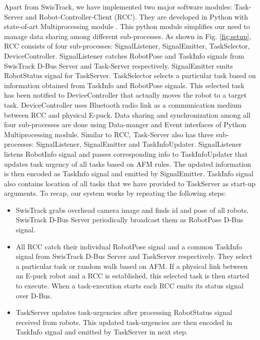 \documentclass{llncs}
\begin{document}
Apart from SwisTrack, we have implemented two major software modules: Task-Server and Robot-Controller-Client (RCC). They are developed in Python with state-of-art Multiprocessing module \cite{Multiprocessing}. This python module simplifies our need to manage data sharing among different sub-processes. As shown in Fig. \ref{fig:setup}, RCC consists of four sub-processes: SignalListener, SignalEmitter, TaskSelector, DeviceController. SignalListener catches RobotPose and TaskInfo signals from SwisTrack D-Bus Server and Task-Server respectively. SignalEmitter emits RobotStatus signal for TaskServer. TaskSelector selects a particular task based on information obtained from TaskInfo and RobotPose signals. This selected task has been notified to DeviceController that actually moves the robot to a target task. DeviceController uses Bluetooth radio link as a communication medium between RCC and physical E-puck. Data sharing and synchronization among all four sub-processes are done using Data-manger and Event interfaces of Python Multiprocessing module. Similar to RCC, Task-Server also has three sub-processes: SignalListener, SignalEmitter and TaskInfoUpdater. SignalListener listens RobotInfo signal and passes corresponding info to TaskInfoUpdater that updates task urgency of all tasks based on AFM rules. The updated information is then encoded as TaskInfo signal and emitted by SignalEmitter. TaskInfo signal also contains location of all tasks that we have provided to TaskServer as start-up arguments. 
To recap, our system works by repeating the following steps:
\begin{itemize}
\item SwisTrack grabs overhead camera image and finds id and pose of all robots. SwisTrack D-Bus Server periodically broadcast them as RobotPose D-Bus signal.
\item All RCC catch their individual RobotPose signal and a common TaskInfo signal from SwisTrack D-Bus Server and TaskServer respectively. They select a particular task or random walk based on AFM. If a physical link between an E-puck robot and a RCC is established, this selected task is then started to execute. When a task-execution starts each RCC emits its status signal over D-Bus.
\item TaskServer updates task-urgencies after processing RobotStatus signal received from robots. This updated task-urgencies are then encoded in TaskInfo signal and emitted by TaskServer in next step.
\end{itemize}
\end{document}
